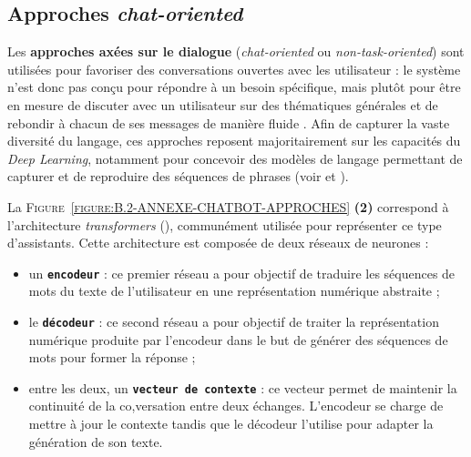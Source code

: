 		
		\subsection{Approches \textit{chat-oriented}}
		\label{annex:B.2.2-ANNEXE-CHATBOTS-APPROCHES-CHAT-ORIENTED}
			
			Les \textbf{approches axées sur le dialogue} (\textit{chat-oriented} ou \textit{non-task-oriented}) sont utilisées pour favoriser des conversations ouvertes avec les utilisateur : le système n'est donc pas conçu pour répondre à un besoin spécifique, mais plutôt pour être en mesure de discuter avec un utilisateur sur des thématiques générales et de rebondir à chacun de ses messages de manière fluide .
			Afin de capturer la vaste diversité du langage, ces approches reposent majoritairement sur les capacités du \textit{Deep Learning}, notamment pour concevoir des modèles de langage permettant de capturer et de reproduire des séquences de phrases (voir \cite{ni-etal:2022:recent-advances-deep} et \cite{kumar-etal:2016:ask-me-anything}).
			
			La \textsc{Figure~\ref{figure:B.2-ANNEXE-CHATBOT-APPROCHES}} \textbf{(2)} correspond à l'architecture \textit{transformers} (\cite{uszkoreit:2017:transformer-novel-neural}), communément utilisée pour représenter ce type d'assistants.
			Cette architecture est composée de deux réseaux de neurones :
			\begin{itemize}
				\item un \textcolor{colorCarrotOrange}{\textbf{\texttt{encodeur}}} :
					ce premier réseau a pour objectif de traduire les séquences de mots du texte de l'utilisateur en une représentation numérique abstraite ;
				\item le \textcolor{colorSilverLakeBlue}{\textbf{\texttt{décodeur}}} :
					ce second réseau a pour objectif de traiter la représentation numérique produite par l'encodeur dans le but de générer des séquences de mots pour former la réponse ;
				\item entre les deux, un \textcolor{colorDarkPastelGreen}{\textbf{\texttt{vecteur de contexte}}} :
					ce vecteur permet de maintenir la continuité de la co,versation entre deux échanges.
					L'encodeur se charge de mettre à jour le contexte tandis que le décodeur l'utilise pour adapter la génération de son texte.
			\end{itemize}
			
